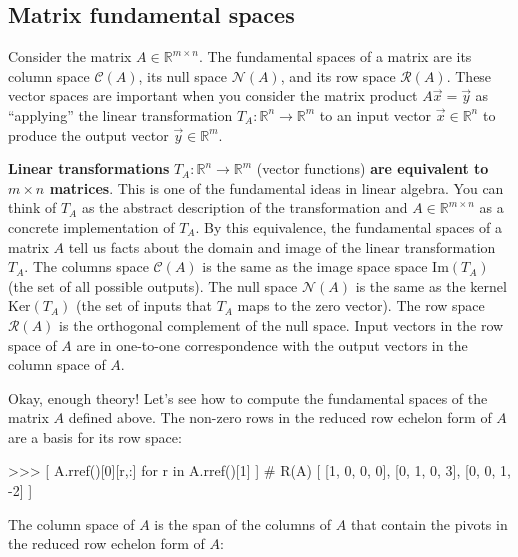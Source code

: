 %



\subsection{Matrix fundamental spaces}
\label{matrices:matrix_fundamental_spaces}

Consider the matrix $A \in \mathbb{R}^{m\times n}$.
The fundamental spaces of a matrix are its column space $\mathcal{C}(A)$, 
its null space $\mathcal{N}(A)$,
and its row space $\mathcal{R}(A)$.
These vector spaces are important when you consider the matrix product
$A\vec{x}=\vec{y}$ as ``applying'' the linear transformation $T_A:\mathbb{R}^n \to \mathbb{R}^m$
to an input vector $\vec{x} \in \mathbb{R}^n$ to produce the output vector $\vec{y} \in \mathbb{R}^m$.

\textbf{Linear transformations} $T_A:\mathbb{R}^n \to \mathbb{R}^m$ (vector functions)
\textbf{are equivalent to $m\times n$ matrices}.
This is one of the fundamental ideas in linear algebra.
You can think of $T_A$ as the abstract description of the transformation 
and $A \in \mathbb{R}^{m\times n}$ as a concrete implementation of $T_A$.
By this equivalence, 
the fundamental spaces of a matrix $A$
tell us facts about the domain and image of the linear transformation $T_A$.
The columns space $\mathcal{C}(A)$ is the same as the image space space $\textrm{Im}(T_A)$ (the set of all possible outputs).
The null space $\mathcal{N}(A)$ is the same as the kernel $\textrm{Ker}(T_A)$ (the set of inputs that $T_A$ maps to the zero vector).
The row space $\mathcal{R}(A)$ is the orthogonal complement of the null space.
Input vectors in the row space of $A$ are in one-to-one correspondence with the output vectors in the column space of $A$.

Okay, enough theory! Let's see how to compute the fundamental spaces of the matrix $A$ defined above.
The non-zero rows in the reduced row echelon form of $A$ are a basis for its row space:

\small
\begin{verbatimtab}
>>> [ A.rref()[0][r,:] for r in A.rref()[1] ]       # R(A)
[  [1, 0, 0, 0],  [0, 1, 0, 3],  [0, 0, 1, -2]   ]
\end{verbatimtab}
\normalsize

\noindent
The column space of $A$ is the span of the columns of $A$ that contain the pivots
in the reduced row echelon form of $A$:



